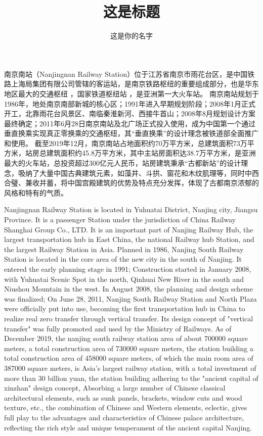 \documentclass[bachelor]{njupthesis}
\title{这是标题}
\author{这是你的名字}
\begin{document}
\makecover

\begin{chineseabstract}
南京南站（Nanjingnan Railway Station）位于江苏省南京市雨花台区，是中国铁路上海局集团有限公司管辖的客运站，是南京铁路枢纽的重要组成部分，也是华东地区最大的交通枢纽 ，国家铁道枢纽站 ，是亚洲第一大火车站。
南京南站规划于1986年，地处南京南部新城的核心区；1991年进入早期规划阶段；2008年1月正式开工，北靠雨花台风景区、南临秦淮新河、西接牛首山；2008年8月规划设计方案最终确定；2011年6月28日南京南站及北广场正式投入使用，成为中国第一个通过垂直换乘实现真正零换乘的交通枢纽，其“垂直换乘”的设计理念被铁道部全面推广和使用。 
截至2019年12月，南京南站占地面积约70万平方米，总建筑面积73万平方米，站房总建筑面积约45.8万平方米，其中主站房面积达38.7万平方米，是亚洲最大的火车站，总投资超过300亿元人民币，站房建筑秉承“古都新站”的设计理念，吸纳了大量中国古典建筑元素，如藻井、斗拱、窗花和木纹肌理等，同时中西合璧、兼收并蓄，将中国宫殿建筑的优势及特点充分发挥，体现了古都南京浓郁的风格和特有的气质。


\end{chineseabstract}

\begin{englishabstract}
Nanjingnan Railway Station is located in Yuhuatai District, Nanjing city, Jiangsu Province. It is a passenger Station under the jurisdiction of China Railway Shanghai Group Co., LTD. It is an important part of Nanjing Railway Hub, the largest transportation hub in East China, the national Railway hub Station, and the largest Railway Station in Asia.
Planned in 1986, Nanjing South Railway Station is located in the core area of the new city in the south of Nanjing. It entered the early planning stage in 1991; Construction started in January 2008, with Yuhuatai Scenic Spot in the north, Qinhuai New River in the south and Niushou Mountain in the west. In August 2008, the planning and design scheme was finalized; On June 28, 2011, Nanjing South Railway Station and North Plaza were officially put into use, becoming the first transportation hub in China to realize real zero transfer through vertical transfer. Its design concept of "vertical transfer" was fully promoted and used by the Ministry of Railways.
As of December 2019, the nanjing south railway station area of about 700000 square meters, a total construction area of 730000 square meters, the station building a total construction area of 458000 square meters, of which the main room area of 387000 square meters, is Asia's largest railway station, with a total investment of more than 30 billion yuan, the station building adhering to the "ancient capital of xinzhan" design concept, Absorbing a large number of Chinese classical architectural elements, such as sunk panels, brackets, window cuts and wood texture, etc., the combination of Chinese and Western elements, eclectic, gives full play to the advantages and characteristics of Chinese palace architecture, reflecting the rich style and unique temperament of the ancient capital Nanjing.

\end{englishabstract}
\end{document}
